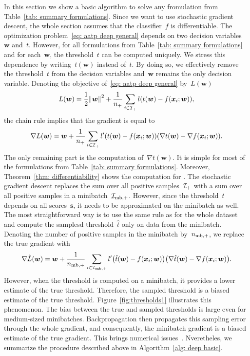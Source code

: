 In this section we show a basic algorithm to solve any fromulation from Table~\ref{tab: summary formulations}. Since we want to use stochastic gradient descent, the whole section assumes that the classifier~$f$ is differentiable. The optimization problem~\eqref{eq: aatp deep general} depends on two decision variables~$\bm{w}$ and~$t.$ However, for all formulations from Table~\ref{tab: summary formulations} and for each~$\bm{w}$, the threshold~$t$ can be computed uniquely. We stress this dependence by writing~$t(\bm{w})$ instead of~$t$. By doing so, we effectively remove the threshold~$t$ from the decision variables and~$\bm{w}$ remains the only decision variable. Denoting the objective of~\eqref{eq: aatp deep general} by~$L(\bm{w})$
\begin{equation*}
  L(\bm{w})
    = \frac{1}{2}\norm{\bm{w}}^2 + \frac{1}{\npos} \sum_{i \in \Ipos} l \Brac{t(\bm{w}) - f(\bm{x}_i; \bm{w})},
\end{equation*}
the chain rule implies that the gradient is equal to
\begin{equation}\label{eq:grad1}
  \nabla L(\bm{w})
    = \bm{w} + \frac{1}{\npos} \sum_{i \in \Ipos} l'\Brac{t(\bm{w}) - f(\bm{x}_i; \bm{w})}\Brac{\nabla t(\bm{w}) - \nabla f(\bm{x}_i; \bm{w})}.
\end{equation}
The only remaining part is the computation of~$\nabla t(\bm{w})$. It is simple for most of the formulations from Table~\ref{tab: summary formulations}. Moreover, Theorem~\ref{thm: differentiability} shows the computation for \PatMat. The stochastic gradient descent replaces the sum over all positive samples~$\mathcal{I}_{+}$ with a sum over all positive samples in a minibatch~$\mathcal{I}_{\text{mb},+}$. However, since the threshold~$t$ depends on all scores~$\bm{s}$, it needs to be approximated on the minibatch as well. The most straightforward way is to use the same rule as for the whole dataset and compute the samplesd threshold~$\hat{t}$ only on data from the minibatch. Denoting the number of positive samples in the minibatch by~$n_{\text{mb},+}$, we replace the true gradient with
\begin{equation}\label{eq:grad2}
  \nabla \hat{L}(\bm{w})
    = \bm{w} + \frac{1}{\nmbpos} \sum_{i \in \Imbpos} l'\Brac{\hat{t}(\bm{w}) - f(\bm{x}_i; \bm{w})}\Brac{\nabla \hat{t}(\bm{w}) - \nabla f(\bm{x}_i; \bm{w})}.
\end{equation}
However, when the threshold is computed on a minibatch, it provides a lower estimate of the true threshold. Therefore, the sampled threshold is a biased estimate of the true threshold. Figure~\ref{fig:thresholds1} illustrates this phenomenon. The bias between the true and sampled thresholds is large even for medium-sized minibatches. Backpropagation then propagates this sampling error through the whole gradient, and consequently, the minibatch gradient is a biased estimate of the true gradient. This brings numerical issues~\cite{bottou2018optimization}. Nveretheles, we summarize the procedure described above in Algorithm~\ref{alg: deep basic}.

